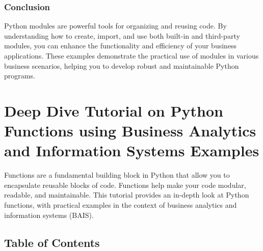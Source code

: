 \documentclass[
  letterpaper,
  DIV=11,
  numbers=noendperiod]{scrreprt}
\begin{document}
\subsection{Conclusion}\label{conclusion-5}

Python modules are powerful tools for organizing and reusing code. By
understanding how to create, import, and use both built-in and
third-party modules, you can enhance the functionality and efficiency of
your business applications. These examples demonstrate the practical use
of modules in various business scenarios, helping you to develop robust
and maintainable Python programs.


\chapter{Deep Dive Tutorial on Python Functions using Business Analytics
and Information Systems
Examples}\label{deep-dive-tutorial-on-python-functions-using-business-analytics-and-information-systems-examples}

Functions are a fundamental building block in Python that allow you to
encapsulate reusable blocks of code. Functions help make your code
modular, readable, and maintainable. This tutorial provides an in-depth
look at Python functions, with practical examples in the context of
business analytics and information systems (BAIS).

\section{Table of Contents}\label{table-of-contents-2}
\end{document}
